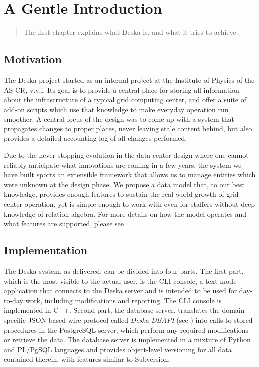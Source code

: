 \documentclass[deska]{subfiles}
\begin{document}
\chapter{A Gentle Introduction}

\begin{abstract}
The first chapter explains what Deska is, and what it tries to achieve.
\end{abstract}

\section{Motivation}

The Deska project started as an internal project at the Institute of Physics of the AS CR, v.v.i.  Its goal is to
provide a central place for storing all information about the infrastructure of a typical grid computing center, and
offer a suite of add-on scripts which use that knowledge to make everyday operation run smoother.  A central focus of
the design was to come up with a system that propagates changes to proper places, never leaving stale content behind,
but also provides a detailed accounting log of all changes performed.

Due to the never-stopping evolution in the data center design where one cannot reliably anticipate what innovations are
coming in a few years, the system we have built sports an extensible framework that allows us to manage entities which
were unknown at the design phase.  We propose a data model that, to our best knowledge, provides enough features to
sustain the real-world growth of grid center operation, yet is simple enough to work with even for staffers without deep
knowledge of relation algebra.  For more details on how the model operates and what features are supported, please see
.

\section{Implementation}

The Deska system, as delivered, can be divided into four parts.  The first part, which is the most visible to the actual
user, is the CLI console, a text-mode application that connects to the Deska server and is intended to be used for
day-to-day work, including modifications and reporting.  The CLI console is implemented in C++.  Second part, the
database server, translates the domain-specific JSON-based wire protocol called {\em Deska DBAPI} (see
) into calls to stored procedures in the PostgreSQL server, which perform any required
modifications or retrieve the data.  The database server is implemented in a mixture of Python and PL/PgSQL languages
and provides object-level versioning for all data contained therein, with features similar to Subversion.
\end{document}
